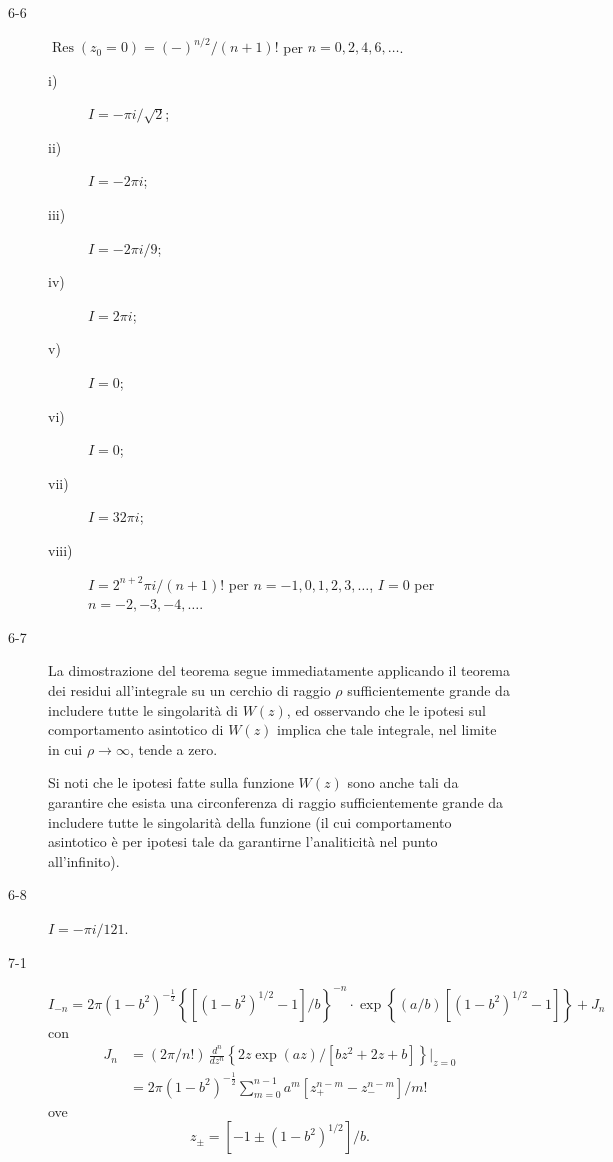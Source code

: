 \documentclass[11pt, a4paper]{book}
\numberwithin{equation}{section}
\begin{document}
\begin{description}
\item[6-6] $\operatorname{Res}(z_0 = 0) = (-)^{n/2}/(n+1)!$ \quad per $n = 0, 2, 4, 6, \ldots$.

\begin{description}
\item[i)] $I = -\pi i/\sqrt{2}$;
\item[ii)] $I = -2\pi i$;
\item[iii)] $I = -2\pi i/9$;
\item[iv)] $I = 2\pi i$; %
\item[v)] $I = 0$;
\item[vi)] $I = 0$;
\item[vii)] $I = 32\pi i$;
\item[viii)] $I = 2^{n+2}\pi i/(n+1)!$ \quad per $n = -1, 0, 1, 2, 3, \ldots$, \quad $I = 0$ \quad per $n = -2, -3, -4, \ldots$.
\end{description}

\item[6-7] La dimostrazione del teorema segue immediatamente applicando il teorema dei residui all'integrale su un cerchio di raggio $\rho$ sufficientemente grande da includere tutte le singolarità di $W(z)$, ed osservando che le ipotesi sul comportamento asintotico di $W(z)$ implica che tale integrale, nel limite in cui $\rho \to \infty$, tende a zero.

Si noti che le ipotesi fatte sulla funzione $W(z)$ sono anche tali da garantire che esista una circonferenza di raggio sufficientemente grande da includere tutte le singolarità della funzione (il cui comportamento asintotico è per ipotesi tale da garantirne l'analiticità nel punto all'infinito).

\item[6-8] $I = -\pi i/121$.

\item[7-1] 
$$I_{-n} = 2\pi (1-b^2)^{-\frac{1}{2}}\left\{\left[(1-b^2)^{1/2} - 1\right]/b\right\}^{-n} \cdot \exp\left\{(a/b)\left[(1-b^2)^{1/2} - 1\right]\right\} + J_n$$
con
\begin{align*}
J_n &= (2\pi/n!)\,\frac{d^n}{dz^n}\left\{2z\exp(az)/\left[bz^2 + 2z + b\right]\right\}\Big|_{z=0} \\
&= 2\pi(1-b^2)^{-\frac{1}{2}}\sum_{m=0}^{n-1} a^m\left[z_+^{n-m} - z_-^{n-m}\right]/m!
\end{align*}
ove
$$z_\pm = \left[-1 \pm (1-b^2)^{1/2}\right]/b.$$


\end{description}
\end{document}
